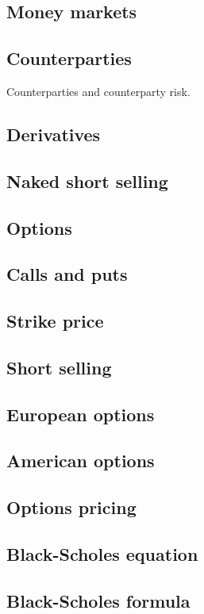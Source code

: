 
\subsection{Money markets}

\subsection{Counterparties}

Counterparties and counterparty risk.

\subsection{Derivatives}

\subsection{Naked short selling}

\subsection{Options}

\subsection{Calls and puts}

\subsection{Strike price}

\subsection{Short selling}

\subsection{European options}

\subsection{American options}


\subsection{Options pricing}

\subsection{Black-Scholes equation}

\subsection{Black-Scholes formula}

